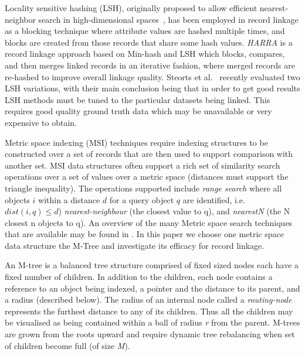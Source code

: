 \documentclass{llncs}
\begin{document}
Locality sensitive hashing (LSH), originally proposed to allow
efficient nearest-neighbor search in high-dimensional
spaces~\cite{Ind98}, has been employed in record linkage as a blocking
technique where attribute values are hashed multiple times, and
blocks are created from those records that share some hash values.
\emph{HARRA} is a record linkage approach based on Min-hash and LSH
which blocks, compares, and then merges linked records in an iterative
fashion, where merged records are re-hashed to improve overall linkage
quality. Steorts et al.~\cite{Steorts2014} recently evaluated two LSH
variations, with their main conclusion being that in order to get good
results LSH methods must be tuned to the particular datasets being
linked. This requires good quality ground truth data which may be
unavailable or very expensive to obtain.

Metric space indexing (MSI) techniques require indexing structures to be constructed over a set of records that are then used to support comparison with another set. MSI data structures often support a rich set of similarity search operations over a set of values over a metric space (distances must support the triangle inequality). The operations supported include \textit{range search} where all objects $i$ within a distance $d$ for a query object $q$ are identified, i.e.\ $dist(i,q) \le d$) \textit{nearest-neighbour} (the closest value to q), and \textit{nearestN} (the N closest n objects to q). An overview of the many Metric space search techniques that are available may be found in \cite{Zezula2010}. In this paper we choose one metric space data structure the M-Tree \cite{paolociaccia2m} and investigate its efficacy for record linkage.

An M-tree is a balanced tree structure comprised of fixed sized nodes each have a fixed number of children. In addition to the children, each node contains a reference to an object being indexed, a pointer and the distance to its parent, and a radius (described below). The radius of an internal node called a \textit{routing-node} represents the  furthest distance to any of its children. Thus all the children may be visualised as being contained within a ball of radius \textit{r} from the parent. M-trees are grown from the roots upward and require dynamic tree rebalancing when set of children become full (of size \textit{M}).
\end{document}
